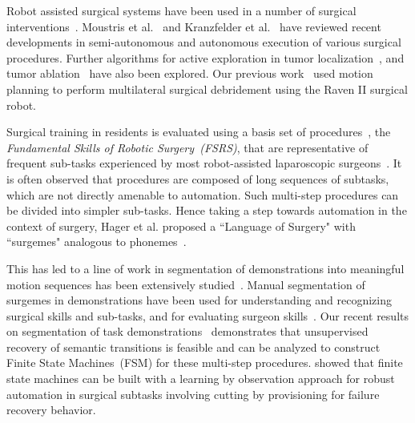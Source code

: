 \documentclass[0-suturing.tex]{subfiles}
\begin{document}
Robot assisted surgical systems have been used in a number of surgical interventions~\cite{Taylor2008,alterovitz2008motion,Wolf2009,Beasley2012}.
Moustris et al.~\cite{Moustris2011} and Kranzfelder et al.~\cite{kranzfelder2013toward} have reviewed recent developments in semi-autonomous and autonomous execution of various surgical procedures. 
Further algorithms for active exploration in tumor localization~\cite{Nichols2013Autonomous}, and tumor ablation~\cite{Hu2015Semi} have also been explored. Our previous work~\cite{Kehoe2014Autonomous} used motion planning to perform multilateral surgical debridement using the Raven II surgical robot.

Surgical training in residents is evaluated using a basis set of  procedures~\cite{stegemann2013fundamental}, the \textit{Fundamental Skills of Robotic Surgery~(FSRS)}, that are representative of frequent sub-tasks experienced by most robot-assisted laparoscopic surgeons~\cite{Ritter2007,dulan2012developing, stegemann2013fundamental}. 
It is often observed that procedures are composed of long sequences of subtasks, which are not directly amenable to automation.
Such multi-step procedures can be divided into simpler sub-tasks. 
Hence taking a step towards automation in the context of surgery, Hager et al. proposed a ``Language of Surgery" with ``surgemes" analogous to phonemes~\cite{Lin2006,Reiley2009,Varadarajan2009}.

This has led to a line of work in segmentation of demonstrations into meaningful motion sequences has been extensively studied~\cite{Konidaris2011,Niekum2015,Gienger2010, lea2015improved}. Manual segmentation of surgemes in demonstrations have been used for understanding and recognizing surgical skills and sub-tasks, and for evaluating surgeon skills~\cite{Reiley2009,Varadarajan2009}.
Our recent results on segmentation of task demonstrations~\cite{krishnan2015tsc} demonstrates that unsupervised recovery of semantic transitions is feasible and can be analyzed to construct Finite State Machines~(FSM) for these multi-step procedures.
\citet{Murali2015Learning} showed that finite state machines can be built with a learning by observation approach for robust automation in surgical subtasks involving cutting by provisioning for failure recovery behavior.
\end{document}

